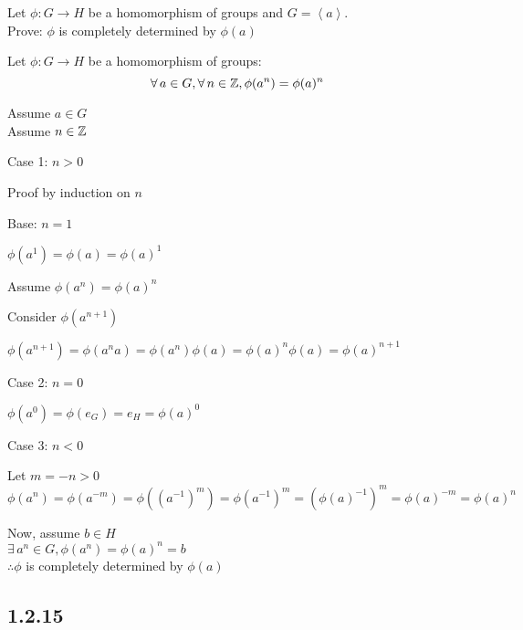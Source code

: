 \documentclass[letterpaper,12pt,fleqn]{article}
\newcommand{\p}{\phi}
\newcommand{\cycle}[1]{\left<#1\right>}
\begin{document}
Let $\p:G\to H$ be a homomorphism of groups and $G=\cycle{a}$. \\
Prove: $\p$ is completely determined by $\p(a)$

\begin{lemma}
  Let $\p:G\to H$ be a homomorphism of groups:
  \[\forall\,a\in G,\forall\,n\in\Z,\p(a^n)=\p(a)^n\]
\end{lemma}

\begin{theproof}
  Assume $a\in G$ \\
  Assume $n\in\mathbb{Z}$
  
  \begin{description}
  \item Case 1: $n>0$

    Proof by induction on $n$

    \begin{description}
    \item Base: $n=1$

      $\p(a^1)=\p(a)=\p(a)^1$

    \item Assume $\p(a^n)=\p(a)^n$

    \item Consider $\p(a^{n+1})$

      $\p(a^{n+1})=\p(a^na)=\p(a^n)\p(a)=\p(a)^n\p(a)=\p(a)^{n+1}$
    \end{description}
    
  \item Case 2: $n=0$

    $\p(a^0)=\p(e_G)=e_H=\p(a)^0$

  \item Case 3: $n<0$

    Let $m=-n>0$ \\
    $\p(a^n)=\p(a^{-m})=\p((a^{-1})^m)=\p(a^{-1})^m=(\p(a)^{-1})^m=\p(a)^{-m}=
    \p(a)^n$
  \end{description}
\end{theproof}

\bigskip

Now, assume $b\in H$ \\
$\exists\,a^n\in G,\p(a^n)=\p(a)^n=b$ \\
$\therefore\p$ is completely determined by $\p(a)$

\subsection*{1.2.15}
\end{document}
